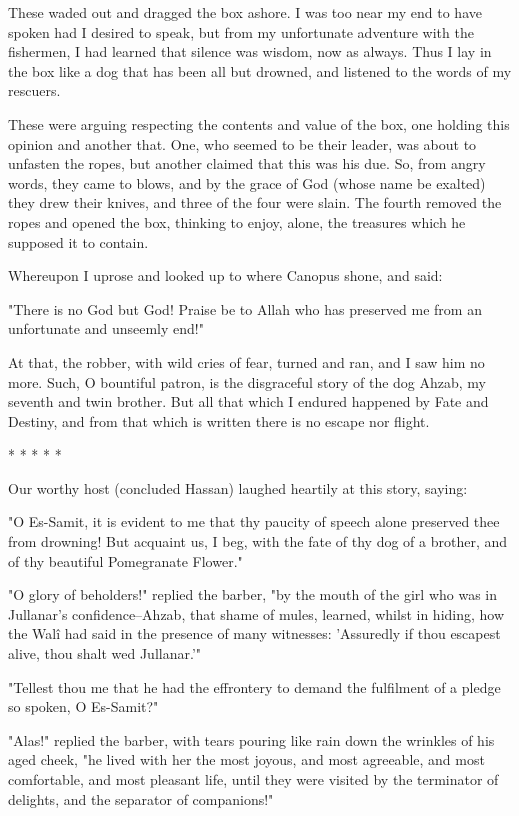 These waded out and dragged the box ashore. I was too near my end to
have spoken had I desired to speak, but from my unfortunate adventure
with the fishermen, I had learned that silence was wisdom, now as
always. Thus I lay in the box like a dog that has been all but
drowned, and listened to the words of my rescuers.

These were arguing respecting the contents and value of the box, one
holding this opinion and another that. One, who seemed to be their
leader, was about to unfasten the ropes, but another claimed that
this was his due. So, from angry words, they came to blows, and by the
grace of God (whose name be exalted) they drew their knives, and three
of the four were slain. The fourth removed the ropes and opened the
box, thinking to enjoy, alone, the treasures which he supposed it to
contain.

Whereupon I uprose and looked up to where Canopus shone, and said:

"There is no God but God! Praise be to Allah who has preserved me
from an unfortunate and unseemly end!"

At that, the robber, with wild cries of fear, turned and ran, and I
saw him no more. Such, O bountiful patron, is the disgraceful story
of the dog Ahzab, my seventh and twin brother. But all that which I
endured happened by Fate and Destiny, and from that which is written
there is no escape nor flight.

       *       *       *       *       *

Our worthy host (concluded Hassan) laughed heartily at this story,
saying:

"O Es-Samit, it is evident to me that thy paucity of speech alone
preserved thee from drowning! But acquaint us, I beg, with the fate
of thy dog of a brother, and of thy beautiful Pomegranate Flower."

"O glory of beholders!" replied the barber, "by the mouth of the girl
who was in Jullanar's confidence--Ahzab, that shame of mules, learned,
whilst in hiding, how the Walî had said in the presence of many
witnesses: 'Assuredly if thou escapest alive, thou shalt wed
Jullanar.'"

"Tellest thou me that he had the effrontery to demand the fulfilment
of a pledge so spoken, O Es-Samit?"

"Alas!" replied the barber, with tears pouring like rain down the
wrinkles of his aged cheek, "he lived with her the most joyous, and
most agreeable, and most comfortable, and most pleasant life, until
they were visited by the terminator of delights, and the separator
of companions!"


